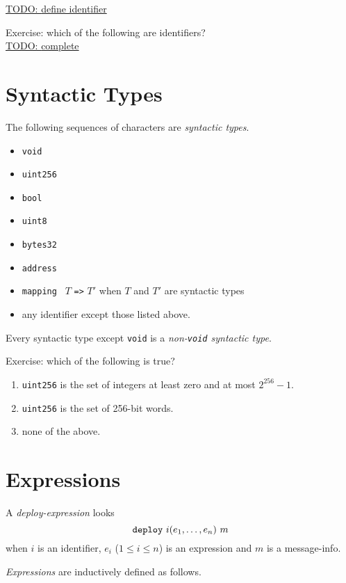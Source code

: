 \documentclass{book}
\newcommand{\todo}[1]{\underline{TODO: {#1}}}
\begin{document}
\todo{define identifier}


Exercise: which of the following are identifiers? \\
\todo{complete}

\section{Syntactic Types}

The following sequences of characters are \textit{syntactic types}.
\begin{itemize}
\item \texttt{void}
\item \texttt{uint256}
\item \texttt{bool}
\item \texttt{uint8}
\item \texttt{bytes32}
\item \texttt{address}
\item \texttt{mapping } $T$ \texttt{=>} $T'$ when $T$ and $T'$ are syntactic types
\item any identifier except those listed above.
\end{itemize}

Every syntactic type except \texttt{void} is a \textit{non-\texttt{void} syntactic type}.

Exercise: which of the following is true?
\begin{enumerate}
\item \texttt{uint256} is the set of integers at least zero and at most $2^{256} - 1$.
\item \texttt{uint256} is the set of 256-bit words.
\item none of the above.
\end{enumerate}

\section{Expressions}

A \textit{deploy-expression} looks
\[
\text{\texttt{deploy}}\ i(e_1,\ldots,e_n)\ m
\]
when $i$ is an identifier, $e_i$ ($1 \le i \le n$) is an expression and $m$ is a message-info.

\textit{Expressions} are inductively defined as follows.
\end{document}
